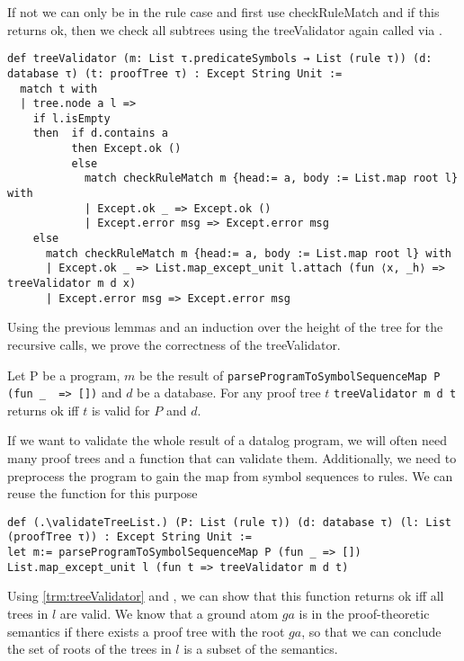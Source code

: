 If not we can only be in the rule case and first use checkRuleMatch and if this returns ok, then we check all subtrees using the treeValidator again called via \Listmapexceptunit.

\begin{lstlisting}
def treeValidator (m: List τ.predicateSymbols → List (rule τ)) (d: database τ) (t: proofTree τ) : Except String Unit :=
  match t with
  | tree.node a l =>
    if l.isEmpty
    then  if d.contains a
          then Except.ok ()
          else
            match checkRuleMatch m {head:= a, body := List.map root l} with
            | Except.ok _ => Except.ok ()
            | Except.error msg => Except.error msg
    else
      match checkRuleMatch m {head:= a, body := List.map root l} with
      | Except.ok _ => List.map_except_unit l.attach (fun ⟨x, _h⟩ => treeValidator m d x)
      | Except.error msg => Except.error msg
\end{lstlisting}

Using the previous lemmas and an induction over the height of the tree for the recursive calls, we prove the correctness of the treeValidator.

\begin{theorem}[\treeValidatorOkIffIsValid]\label{trm:treeValidator}
    Let P be a program, $m$ be the result of \lstinline|parseProgramToSymbolSequenceMap P (fun _  => [])| and $d$ be a database. For any proof tree $t$ \lstinline|treeValidator m d t| returns ok iff $t$ is valid for $P$ and $d$.
\end{theorem}


If we want to validate the whole result of a datalog program, we will often need many proof trees and a function that can validate them. Additionally, we need to preprocess the program to gain the map from symbol sequences to rules. We can reuse the \Listmapexceptunit function for this purpose

\begin{lstlisting}
def (.\validateTreeList.) (P: List (rule τ)) (d: database τ) (l: List (proofTree τ)) : Except String Unit :=
let m:= parseProgramToSymbolSequenceMap P (fun _ => [])
List.map_except_unit l (fun t => treeValidator m d t)
\end{lstlisting}

Using \cref{trm:treeValidator} and \ListmapexceptunitIsUnitIffAll, we can show that this function returns ok iff all trees in $l$ are valid. We know that a ground atom $ga$ is in the proof-theoretic semantics if there exists a proof tree with the root $ga$, so that we can conclude the set of roots of the trees in $l$ is a subset of the semantics. 


